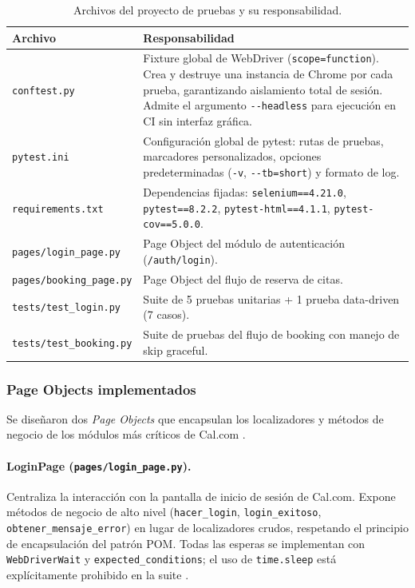 \documentclass{article}
\begin{document}
\begin{table}[htbp]
  \centering
  \caption{Archivos del proyecto de pruebas y su responsabilidad.}
  \label{tab:archivos-suite}
  \begin{tabular}{lp{9cm}}
    \toprule
    \textbf{Archivo} & \textbf{Responsabilidad} \\
    \midrule
    \texttt{conftest.py}
      & Fixture global de WebDriver (\texttt{scope=\allowbreak{}function}).
        Crea y destruye una instancia de Chrome por cada prueba, garantizando
        aislamiento total de sesión. Admite el argumento \texttt{-{}-headless}
        para ejecución en CI sin interfaz gráfica. \\
    \texttt{pytest.ini}
      & Configuración global de pytest: rutas de pruebas, marcadores
        personalizados, opciones predeterminadas (\texttt{-v},
        \texttt{-{}-tb=short}) y formato de log. \\
    \texttt{requirements.txt}
      & Dependencias fijadas: \texttt{selenium==4.21.0},
        \texttt{pytest==8.2.2}, \texttt{pytest-html==4.1.1},
        \texttt{pytest-cov==5.0.0}. \\
    \texttt{pages/login\_page.py}
      & Page Object del módulo de autenticación (\texttt{/auth/login}). \\
    \texttt{pages/booking\_page.py}
      & Page Object del flujo de reserva de citas. \\
    \texttt{tests/test\_login.py}
      & Suite de 5 pruebas unitarias + 1 prueba data-driven (7 casos). \\
    \texttt{tests/test\_booking.py}
      & Suite de pruebas del flujo de booking con manejo de skip graceful. \\
    \bottomrule
  \end{tabular}
\end{table}

\subsubsection{Page Objects implementados}

Se diseñaron dos \textit{Page Objects} que encapsulan los localizadores
y métodos de negocio de los módulos más críticos de Cal.com
\parencite{Aniche2022}.

\paragraph{LoginPage (\texttt{pages/login\_page.py}).}
Centraliza la interacción con la pantalla de inicio de sesión de Cal.com.
Expone métodos de negocio de alto nivel (\texttt{hacer\_login},
\texttt{login\_exitoso}, \texttt{obtener\_mensaje\_error}) en lugar de
localizadores crudos, respetando el principio de encapsulación del patrón POM.
Todas las esperas se implementan con \texttt{WebDriverWait} y
\texttt{expected\_conditions}; el uso de \texttt{time.sleep} está
explícitamente prohibido en la suite \parencite{Garcia2022}.
\end{document}
